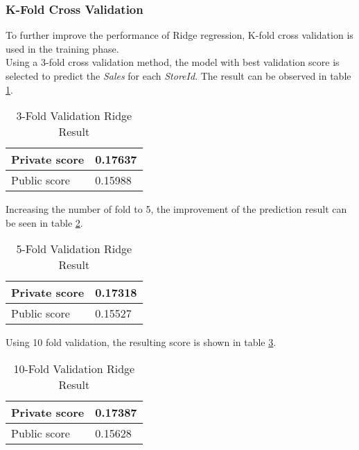 \subsubsection{K-Fold Cross Validation}
To further improve the performance of Ridge regression, K-fold cross validation is used in the training phase.
\\
Using a 3-fold cross validation method, the model with best validation score is selected to predict the \textit{Sales} for each \textit{StoreId}. The result can be observed in table \ref{tab:ridge_3_fold}.
\begin{table}[H]
	\centering
	\caption{3-Fold Validation Ridge Result}
	\label{tab:ridge_3_fold}
	\begin{tabular}{|m{100pt}|m{50pt}|}
		\hline
		Private score & 0.17637 \\ \hline
		Public score  & 0.15988 \\ \hline
	\end{tabular}
\end{table}

\noindent
Increasing the number of fold to 5, the improvement of the prediction result can be seen in table \ref{tab:ridge_5_fold}.
\begin{table}[H]
	\centering
	\caption{5-Fold Validation Ridge Result}
	\label{tab:ridge_5_fold}
	\begin{tabular}{|m{100pt}|m{50pt}|}
		\hline
		Private score & 0.17318 \\ \hline
		Public score  & 0.15527 \\ \hline
	\end{tabular}
\end{table}

\noindent
Using 10 fold validation, the resulting score is shown in table \ref{tab:ridge_10_fold}.
\begin{table}[H]
	\centering
	\caption{10-Fold Validation Ridge Result}
	\label{tab:ridge_10_fold}
	\begin{tabular}{|m{100pt}|m{50pt}|}
		\hline
		Private score & 0.17387 \\ \hline
		Public score  & 0.15628 \\ \hline
	\end{tabular}
\end{table}

